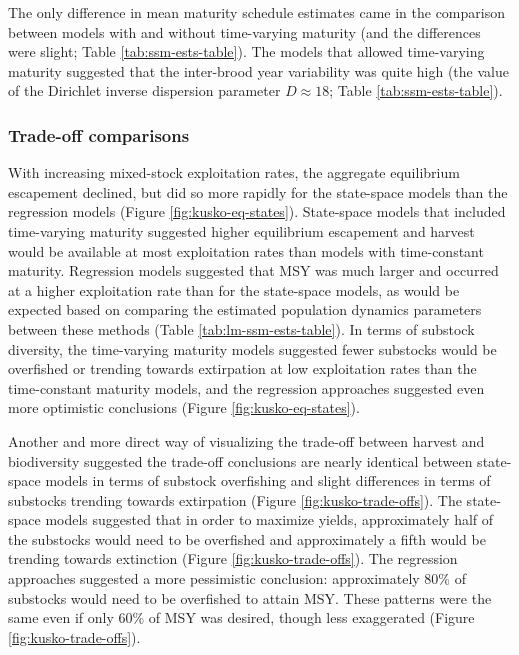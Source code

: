 \documentclass[12pt,]{book}
\theoremstyle{definition}
\theoremstyle{definition}
\theoremstyle{definition}
\theoremstyle{remark}
\begin{document}
The only difference in mean maturity schedule estimates came in the
comparison between models with and without time-varying maturity (and
the differences were slight; Table \ref{tab:ssm-ests-table}). The models
that allowed time-varying maturity suggested that the inter-brood year
variability was quite high (the value of the Dirichlet inverse
dispersion parameter \(D \approx 18\); Table \ref{tab:ssm-ests-table}).

\subsubsection{Trade-off comparisons}\label{trade-off-comparisons}

\noindent
With increasing mixed-stock exploitation rates, the aggregate
equilibrium escapement declined, but did so more rapidly for the
state-space models than the regression models (Figure
\ref{fig:kusko-eq-states}). State-space models that included
time-varying maturity suggested higher equilibrium escapement and
harvest would be available at most exploitation rates than models with
time-constant maturity. Regression models suggested that MSY was much
larger and occurred at a higher exploitation rate than for the
state-space models, as would be expected based on comparing the
estimated population dynamics parameters between these methods (Table
\ref{tab:lm-ssm-ests-table}). In terms of substock diversity, the
time-varying maturity models suggested fewer substocks would be
overfished or trending towards extirpation at low exploitation rates
than the time-constant maturity models, and the regression approaches
suggested even more optimistic conclusions (Figure
\ref{fig:kusko-eq-states}).

Another and more direct way of visualizing the trade-off between harvest
and biodiversity suggested the trade-off conclusions are nearly
identical between state-space models in terms of substock overfishing
and slight differences in terms of substocks trending towards
extirpation (Figure \ref{fig:kusko-trade-offs}). The state-space models
suggested that in order to maximize yields, approximately half of the
substocks would need to be overfished and approximately a fifth would be
trending towards extinction (Figure \ref{fig:kusko-trade-offs}). The
regression approaches suggested a more pessimistic conclusion:
approximately 80\% of substocks would need to be overfished to attain
MSY. These patterns were the same even if only 60\% of MSY was desired,
though less exaggerated (Figure \ref{fig:kusko-trade-offs}).
\end{document}
